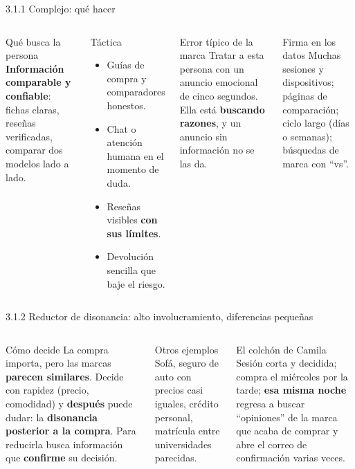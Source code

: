 \documentclass[aspectratio=169,xcolor=dvipsnames]{beamer}
\begin{document}
\begin{frame}{3.1.1 Complejo: qué hacer}
\begin{columns}[T]
  \begin{block}{Qué busca la persona}
    \footnotesize \textbf{Información comparable y confiable}: fichas claras, reseñas verificadas, comparar dos modelos lado a lado.
  \end{block}
  \begin{block}{Táctica}
    \footnotesize
    \begin{itemize}
      \item Guías de compra y comparadores honestos.
      \item Chat o atención humana en el momento de duda.
      \item Reseñas visibles \textbf{con sus límites}.
      \item Devolución sencilla que baje el riesgo.
    \end{itemize}
  \end{block}
  \begin{alertblock}{Error típico de la marca}
    \footnotesize Tratar a esta persona con un anuncio emocional de cinco segundos. Ella está \textbf{buscando razones}, y un anuncio sin información no se las da.
  \end{alertblock}
  \begin{exampleblock}{Firma en los datos}
    \footnotesize Muchas sesiones y dispositivos; páginas de comparación; ciclo largo (días o semanas); búsquedas de marca con \enquote{vs}.
  \end{exampleblock}
\end{columns}
\end{frame}

\begin{frame}{3.1.2 Reductor de disonancia: alto involucramiento, diferencias pequeñas}
\begin{columns}[T]
  \begin{block}{Cómo decide}
    \small La compra importa, pero las marcas \textbf{parecen similares}. Decide con rapidez (precio, comodidad) y \textbf{después} puede dudar: la \textbf{disonancia posterior a la compra}. Para reducirla busca información que \textbf{confirme} su decisión.
  \end{block}
  \begin{block}{Otros ejemplos}
    \small Sofá, seguro de auto con precios casi iguales, crédito personal, matrícula entre universidades parecidas.
  \end{block}
  \begin{exampleblock}{El colchón de Camila}
    \small Sesión corta y decidida; compra el miércoles por la tarde; \textbf{esa misma noche} regresa a buscar \enquote{opiniones} de la marca que acaba de comprar y abre el correo de confirmación varias veces.
  \end{exampleblock}
\end{columns}
\end{frame}
\end{document}
